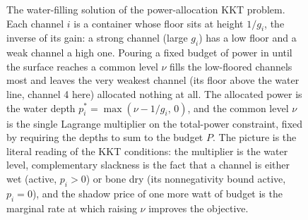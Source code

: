 \begin{figure}[ht]
\centering
{}
\caption[Water-filling power allocation]{The water-filling solution of
the power-allocation KKT problem. Each channel $i$ is a container whose
floor sits at height $1/g_{i}$, the inverse of its gain: a strong
channel (large $g_{i}$) has a low floor and a weak channel a high one.
Pouring a fixed budget of power in until the surface reaches a common
level $\nu$ fills the low-floored channels most and leaves the very
weakest channel (its floor above the water line, channel 4 here)
allocated nothing at all. The allocated power is the water depth
$p_{i}^{*} = \max(\nu - 1/g_{i},\, 0)$, and the common level $\nu$ is
the single Lagrange multiplier on the total-power constraint, fixed by
requiring the depths to sum to the budget $P$. The picture is the
literal reading of the KKT conditions: the multiplier is the water
level, complementary slackness is the fact that a channel is either wet
(active, $p_{i} > 0$) or bone dry (its nonnegativity bound active,
$p_{i} = 0$), and the shadow price of one more watt of budget is the
marginal rate at which raising $\nu$ improves the objective.}
\label{fig:vol02:ch15:water-filling}
\end{figure}
